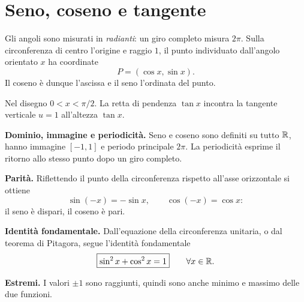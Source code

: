 \section{Seno, coseno e tangente}

Gli angoli sono misurati in \emph{radianti}: un giro completo misura $2\pi$. Sulla circonferenza di centro l'origine e raggio $1$, il punto individuato dall'angolo orientato $x$ ha coordinate
\[
P=(\cos x,\sin x).
\]
Il coseno è dunque l'ascissa e il seno l'ordinata del punto.

\begin{schema}

Nel disegno $0<x<\pi/2$. La retta di pendenza $\tan x$ incontra la tangente verticale $u=1$ all'altezza $\tan x$.
\end{schema}

\textbf{Dominio, immagine e periodicità.} Seno e coseno sono definiti su tutto $\mathbb{R}$, hanno immagine $[-1,1]$ e periodo principale $2\pi$. La periodicità esprime il ritorno allo stesso punto dopo un giro completo.

\textbf{Parità.} Riflettendo il punto della circonferenza rispetto all'asse orizzontale si ottiene
\[
\sin(-x)=-\sin x,\qquad \cos(-x)=\cos x:
\]
il seno è dispari, il coseno è pari.

\textbf{Identità fondamentale.} Dall'equazione della circonferenza unitaria, o dal teorema di Pitagora, segue l'identità fondamentale
\[
\boxed{\sin^2x+\cos^2x=1}\qquad\forall x\in\mathbb{R}.
\]


\textbf{Estremi.} I valori $\pm1$ sono raggiunti, quindi sono anche minimo e massimo delle due funzioni.

